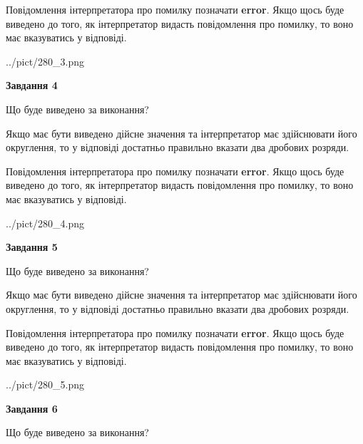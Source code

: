\documentclass[12pt, ukrainian]{article}
\begin{document}
{\begin {Large}
Повідомлення інтерпретатора про помилку позначати \textbf{error}.
Якщо щось буде виведено до того, як інтерпретатор видасть повідомлення про помилку, 
то воно має вказуватись у відповіді. \par

\begin{center}
	{../pict/280_3.png}
\end{center}
\newpage

{\begin {center}\textbf{Завдання 4}\end {center}}\par
Що буде виведено за виконання? \par

Якщо має бути виведено дійсне значення та інтерпретатор має здійснювати його округлення, 
то у відповіді достатньо правильно вказати два дробових розряди.

Повідомлення інтерпретатора про помилку позначати \textbf{error}.
Якщо щось буде виведено до того, як інтерпретатор видасть повідомлення про помилку, 
то воно має вказуватись у відповіді. \par

\begin{center}
	{../pict/280_4.png}
\end{center}
\newpage

{\begin {center}\textbf{Завдання 5}\end {center}}\par
Що буде виведено за виконання? \par

Якщо має бути виведено дійсне значення та інтерпретатор має здійснювати його округлення, 
то у відповіді достатньо правильно вказати два дробових розряди.

Повідомлення інтерпретатора про помилку позначати \textbf{error}.
Якщо щось буде виведено до того, як інтерпретатор видасть повідомлення про помилку, 
то воно має вказуватись у відповіді. \par

\begin{center}
	{../pict/280_5.png}
\end{center}
\newpage

{\begin {center}\textbf{Завдання 6}\end {center}}\par
Що буде виведено за виконання? \par


\end{Large}}
\end{document}
